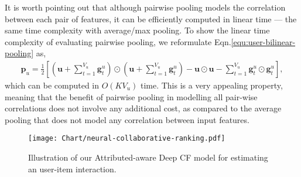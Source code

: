 \documentclass[sigconf]{acmart}
\newcommand{\Mat}[1]{\mathbf{#1}}
\begin{document}
It is worth pointing out that although pairwise pooling models the correlation between each pair of features, it can be efficiently computed in linear time --- the same time complexity with average/max pooling. To show the linear time complexity of evaluating pairwise pooling, we reformulate Eqn.\eqref{equ:user-bilinear-pooling} as,
\begin{gather}
\Mat{p}_{u}=\frac{1}{2}\left[(\Mat{u}+\sum_{t=1}^{V_{u}}\Mat{g}_{t}^{u})\odot(\Mat{u}+\sum_{t=1}^{V_{u}}\Mat{g}_{t}^{u})-\Mat{u}\odot\Mat{u}-\sum_{t=1}^{V_{u}}\Mat{g}_{t}^{u}\odot\Mat{g}_{t}^{u}\right],
\end{gather}
which can be computed in $O(K V_{u})$ time. This is a very appealing property, meaning that the benefit of pairwise pooling in modelling all pair-wise correlations does not involve any additional cost, as compared to the average pooling that does not model any correlation between input features.


\begin{figure}
	\centering
\texttt{[image: Chart/neural-collaborative-ranking.pdf]}\\
	\vspace{-5pt}
	\caption{Illustration of our Attributed-aware Deep CF model for estimating an user-item interaction.}\label{fig:neural-collaborative-ranking}
	\vspace{-1em}
\end{figure}
\end{document}
